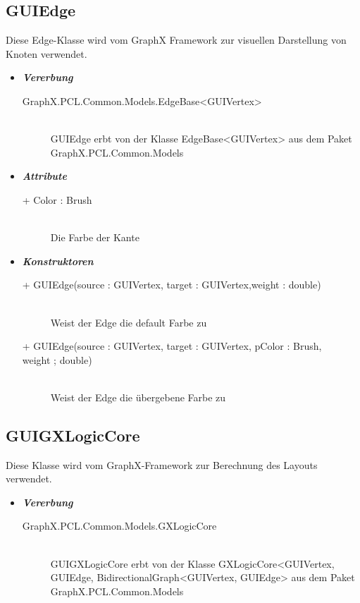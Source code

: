\documentclass[13pt]{scrreprt}
\begin{document}
	\subsection{GUIEdge}
	Diese Edge-Klasse wird vom GraphX Framework zur visuellen Darstellung von Knoten verwendet.
	\begin{itemize}[label = {$\circ$}]
		\item {\large \textbf{\textit{Vererbung}}\par}
		\begin{description}
			\item [GraphX.PCL.Common.Models.EdgeBase<GUIVertex>] \hfill \\ GUIEdge erbt von der Klasse EdgeBase<GUIVertex> aus dem Paket GraphX.PCL.Common.Models
		\end{description}
		\item {\large \textbf{\textit{Attribute}}\par}
		\begin{description}
			\item [+ Color : Brush] \hfill \\Die Farbe der Kante
		\end{description}
		\item {\large \textbf{\textit{Konstruktoren}}\par}
		\begin{description}
			\item [+ GUIEdge(source : GUIVertex, target : GUIVertex,weight : double)] \hfill \\ Weist der Edge die default Farbe zu
			\item [+ GUIEdge(source : GUIVertex, target : GUIVertex, pColor : Brush,]
			\item [weight ; double)] \hfill \\ Weist der Edge die übergebene Farbe zu
		\end{description}
	\end{itemize}
	
	\subsection{GUIGXLogicCore}
	Diese Klasse wird vom GraphX-Framework zur Berechnung des Layouts verwendet.
	\begin{itemize}[label = {$\circ$}]
		\item {\large \textbf{\textit{Vererbung}}\par}
		\begin{description}
			\item [GraphX.PCL.Common.Models.GXLogicCore] \hfill \\ GUIGXLogicCore erbt von der Klasse GXLogicCore<GUIVertex, GUIEdge, BidirectionalGraph<GUIVertex, GUIEdge> aus dem Paket GraphX.PCL.Common.Models
		\end{description}
	\end{itemize}
	
\end{document}
